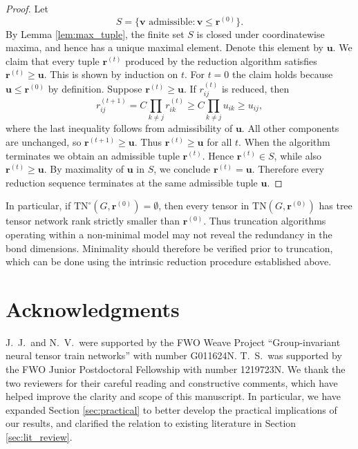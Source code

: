 \documentclass{amsart}
\theoremstyle{plain}
\theoremstyle{definition}
\theoremstyle{remark}
\begin{document}
\begin{proof}
    Let
    \[
    S=\{\mathbf v \text{ admissible} : \mathbf v \le \mathbf r^{(0)}\}.
    \]
    By Lemma \ref{lem:max_tuple}, the finite set $S$ is closed under coordinatewise maxima, and hence has a unique maximal element. Denote this element by $\mathbf u$. We claim that every tuple $\mathbf r^{(t)}$ produced by the reduction algorithm satisfies $\mathbf r^{(t)} \ge \mathbf u$. This is shown by induction on $t$. For $t=0$ the claim holds because $\mathbf u \le \mathbf r^{(0)}$ by definition. Suppose $\mathbf r^{(t)} \ge \mathbf u$. If $r^{(t)}_{ij}$ is reduced, then
    \[
    r^{(t+1)}_{ij}
    = C\prod_{k\ne j} r^{(t)}_{ik}
    \ge C\prod_{k\ne j} u_{ik}
    \ge u_{ij},
    \]
    where the last inequality follows from admissibility of $\mathbf u$. All other components are unchanged, so $\mathbf r^{(t+1)} \ge \mathbf u$. Thus $\mathbf r^{(t)} \ge \mathbf u$ for all $t$. When the algorithm terminates we obtain an admissible tuple $\mathbf r^{(t)}$. Hence $\mathbf r^{(t)} \in S$, while also $\mathbf r^{(t)} \ge \mathbf u$. By maximality of $\mathbf u$ in $S$, we conclude $\mathbf r^{(t)}=\mathbf u$. Therefore every reduction sequence terminates at the same admissible tuple $\mathbf u$.
\end{proof}

In particular, if $\mathrm{TN}^\circ(G, \mathbf{r}^{(0)})=\emptyset$, then every tensor in $\mathrm{TN}(G, \mathbf{r}^{(0)})$ has tree tensor network rank strictly smaller than $\mathbf{r}^{(0)}$. Thus truncation algorithms operating within a non-minimal model may not reveal the redundancy in the bond dimensions. Minimality should therefore be verified prior to truncation, which can be done using the intrinsic reduction procedure established above.

\section*{Acknowledgments}
J.~J.~and N.~V.~were supported by the FWO Weave Project ``Group-invariant neural tensor train networks'' with number G011624N. T.~S.~was supported by the FWO Junior Postdoctoral Fellowship with number 1219723N. We thank the two reviewers for their careful reading and constructive comments, which have helped improve the clarity and scope of this manuscript. In particular, we have expanded Section \ref{sec:practical} to better develop the practical implications of our results, and clarified the relation to existing literature in Section \ref{sec:lit_review}. 

\printbibliography
\end{document}
